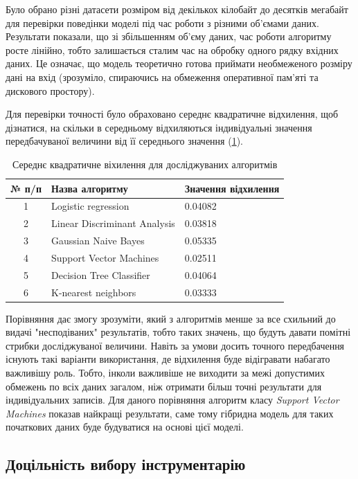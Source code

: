 Було обрано різні датасети розміром від декількох кілобайт до десятків мегабайт для перевірки поведінки моделі під час роботи з різними об'ємами даних. Результати показали, що зі збільшенням об'єму даних, час роботи алгоритму росте лінійно, тобто залишається сталим час на обробку одного рядку вхідних даних. Це означає, що модель теоретично готова приймати необмеженого розміру дані на вхід (зрозуміло, спираючись на обмеження оперативної пам'яті та дискового простору).

Для перевірки точності було обраховано середнє квадратичне відхилення, щоб дізнатися, на скільки в середньому відхиляються індивідуальні значення передбачуваної величини від її середнього значення (\ref{tab:standard_deviation}).

\begin{table}[h!]
	\begin{tabularx}{\textwidth}{|c|X|X|}
    \hline
    № п/п & Назва алгоритму & Значення відхилення \\ \hline
    1 & Logistic regression & 0.04082 \\ \hline
    2 & Linear Discriminant Analysis & 0.03818 \\ \hline
    3 & Gaussian Naive Bayes & 0.05335 \\ \hline
    4 & Support Vector Machines & 0.02511 \\ \hline
    5 & Decision Tree Classifier & 0.04064 \\ \hline
    6 & K-nearest neighbors & 0.03333 \\
    \hline
    \end{tabularx}
\caption{Середнє квадратичне віхилення для досліджуваних алгоритмів} \label{tab:standard_deviation}
\end{table}

Порівняння дає змогу зрозуміти, який з алгоритмів менше за все схильний до видачі "несподіваних" результатів, тобто таких значень, що будуть давати помітні стрибки досліджуваної величини. Навіть за умови досить точного передбачення існують такі варіанти використання, де відхилення буде відігравати набагато важливішу роль. Тобто, інколи важливіше не виходити за межі допустимих обмежень по всіх даних загалом, ніж отримати більш точні результати для індивідуальних записів. Для даного порівняння алгоритм класу \textit{Support Vector Machines} показав найкращі результати, саме тому гібридна модель для таких початкових даних буде будуватися на основі цієї моделі.

\subsection{Доцільність вибору інструментарію}

